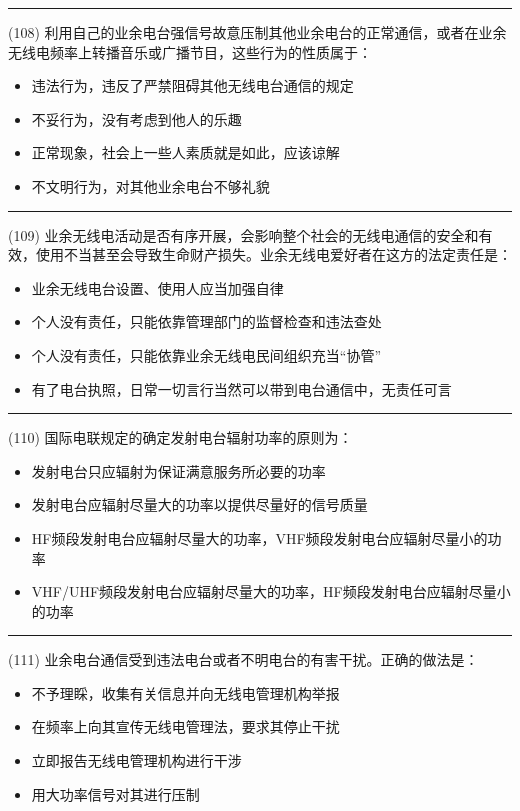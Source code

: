 \documentclass[twocolumn]{ctexart}  %
\begin{document}
\noindent\rule{0.5\textwidth}{1pt}
\heiti (108) 利用自己的业余电台强信号故意压制其他业余电台的正常通信，或者在业余无线电频率上转播音乐或广播节目，这些行为的性质属于： \songti {\color{gray} [LK0072] }
\begin{itemize}
	\item  违法行为，违反了严禁阻碍其他无线电台通信的规定
	\item  不妥行为，没有考虑到他人的乐趣
	\item  正常现象，社会上一些人素质就是如此，应该谅解
	\item  不文明行为，对其他业余电台不够礼貌
\end{itemize}


\noindent\rule{0.5\textwidth}{1pt}
\heiti (109) 业余无线电活动是否有序开展，会影响整个社会的无线电通信的安全和有效，使用不当甚至会导致生命财产损失。业余无线电爱好者在这方的法定责任是： \songti {\color{gray} [LK0073] }
\begin{itemize}
	\item  业余无线电台设置、使用人应当加强自律
	\item  个人没有责任，只能依靠管理部门的监督检查和违法查处
	\item  个人没有责任，只能依靠业余无线电民间组织充当“协管”
	\item  有了电台执照，日常一切言行当然可以带到电台通信中，无责任可言
\end{itemize}


\noindent\rule{0.5\textwidth}{1pt}
\heiti (110) 国际电联规定的确定发射电台辐射功率的原则为： \songti {\color{gray} [LK0181] }
\begin{itemize}
	\item  发射电台只应辐射为保证满意服务所必要的功率
	\item  发射电台应辐射尽量大的功率以提供尽量好的信号质量
	\item  HF频段发射电台应辐射尽量大的功率，VHF频段发射电台应辐射尽量小的功率
	\item  VHF/UHF频段发射电台应辐射尽量大的功率，HF频段发射电台应辐射尽量小的功率
\end{itemize}


\noindent\rule{0.5\textwidth}{1pt}
\heiti (111) 业余电台通信受到违法电台或者不明电台的有害干扰。正确的做法是： \songti {\color{gray} [LK0247] }
\begin{itemize}
	\item  不予理睬，收集有关信息并向无线电管理机构举报
	\item  在频率上向其宣传无线电管理法，要求其停止干扰
	\item  立即报告无线电管理机构进行干涉
	\item  用大功率信号对其进行压制
\end{itemize}
\end{document}
